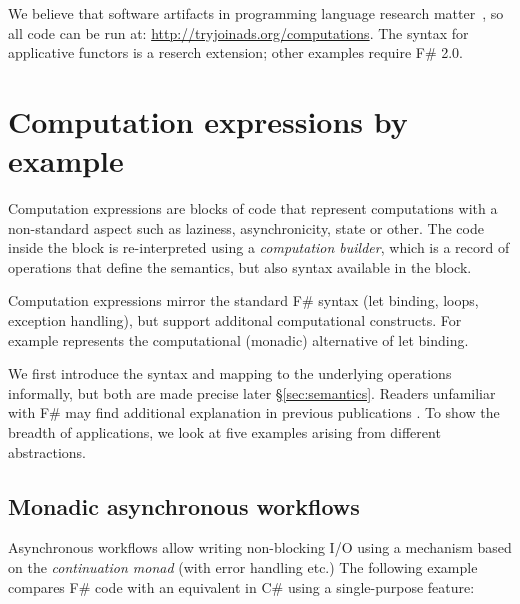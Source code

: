 \documentclass[runningheads,a4paper]{llncs}
\begin{document}
\vspace{1.0em}
\noindent
We believe that software artifacts in programming language research matter~\cite{artifacts}, so all 
code can be run at: \url{http://tryjoinads.org/computations}. 
The syntax for applicative functors is a reserch extension; other examples require F\# 2.0.


\section{Computation expressions by example}
\label{sec:intro}

Computation expressions are blocks of code that represent computations with a non-standard 
aspect such as laziness, asynchronicity, state or other. The code inside the block is re-interpreted 
using a \emph{computation builder}, which is a record of operations that define the semantics,
but also syntax available in the block.

Computation expressions mirror the standard F\# syntax (let binding, loops, exception handling),
but support additonal computational constructs. For example  represents the computational 
(monadic) alternative of let binding.

We first introduce the syntax and mapping to the underlying operations informally, but both are made 
precise later \S\ref{sec:semantics}. Readers unfamiliar with F\# may find additional explanation
in previous publications \cite{fsharp-spec}. To show the breadth of applications, 
we look at five examples arising from different abstractions.


\subsection{Monadic asynchronous workflows}
\label{sec:intro-async}

Asynchronous workflows \cite{fs-async} allow writing non-blocking I/O using a mechanism based on the 
\emph{continuation monad} (with error handling etc.) The following example compares F\# code
with an equivalent in C\# using a single-purpose feature:
\end{document}
